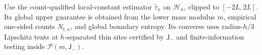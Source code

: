 Use the count-qualified local-constant estimator \(\widehat\tau_n\) on \(\mathcal H_n\), clipped to \([-2L,2L]\). Its global upper guarantee is obtained from the lower mass modulus \(m\), empirical one-sided counts \(N_{t,n}\), and global boundary entropy. Its converse uses radius-\(h/3\) Lipschitz tents at \(h\)-separated thin sites certified by \(\mathsf J_{-}\) and finite-information testing inside \(\mathcal P(m,\mathsf J_{-})\).